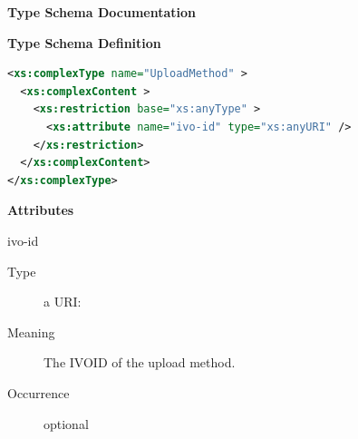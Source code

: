 \documentclass{ivoa}
\begin{document}
\begin{generated}
\begingroup
      	\renewcommand*\descriptionlabel[1]{%
      	\hbox to 5.5em{\emph{#1}\hfil}}\vspace{2ex}\noindent\textbf{ Type Schema Documentation}



\vspace{1ex}\noindent\textbf{ Type Schema Definition}

\begin{lstlisting}[language=XML,basicstyle=\footnotesize]
<xs:complexType name="UploadMethod" >
  <xs:complexContent >
    <xs:restriction base="xs:anyType" >
      <xs:attribute name="ivo-id" type="xs:anyURI" />
    </xs:restriction>
  </xs:complexContent>
</xs:complexType>
\end{lstlisting}

\vspace{0.5ex}\noindent\textbf{ Attributes}

\begingroup\small\begin{bigdescription}
\item[ivo-id]
\begin{description}
\item[Type] a URI: 
\item[Meaning] 
            The IVOID of the upload method.
            
\item[Occurrence] optional
\end{description}


\end{bigdescription}\endgroup

\endgroup
\end{generated}
\end{document}
